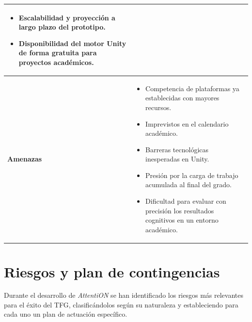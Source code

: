 \documentclass[12pt, a4paper]{report}
\begin{document}
\begin{table}[H]
\begin{tabularx}{\textwidth}{|>{\bfseries}p{3.5cm}|X|}
\begin{itemize}[leftmargin=*, nosep, after=\vspace{2pt}]
  \item Escalabilidad y proyección a largo plazo del prototipo.
  \item Disponibilidad del motor Unity de forma gratuita para proyectos
    académicos.
\end{itemize} \\
\hline
Amenazas &
\begin{itemize}[leftmargin=*, nosep, after=\vspace{2pt}]
  \item Competencia de plataformas ya establecidas con mayores recursos.
  \item Imprevistos en el calendario académico.
  \item Barreras tecnológicas inesperadas en Unity.
  \item Presión por la carga de trabajo acumulada al final del grado.
  \item Dificultad para evaluar con precisión los resultados cognitivos en
    un entorno académico.
\end{itemize} \\
\hline
\end{tabularx}
\end{table}

\section{Riesgos y plan de contingencias}

Durante el desarrollo de \textit{AttentiON} se han identificado los riesgos
más relevantes para el éxito del TFG, clasificándolos según su naturaleza y
estableciendo para cada uno un plan de actuación específico.
\end{document}
